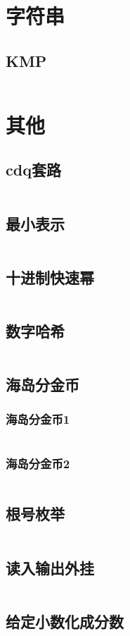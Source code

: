 \documentclass{article}
\begin{document}
\newpage
\section{字符串}
\subsection{KMP}
\inputminted[breaklines]{c++}{../字符串/KMP.cpp}

\newpage
\section{其他}

\subsection{cdq套路}
\inputminted[breaklines]{text}{../其他/cdq.cpp}

\subsection{最小表示}
\inputminted[breaklines]{c++}{../其他/最小表示.cpp}

\subsection{十进制快速幂}
\inputminted[breaklines]{c++}{../其他/十进制快速幂.cpp}

\subsection{数字哈希}
\inputminted[breaklines]{c++}{../其他/数字哈希.cpp}

\subsection{海岛分金币}
\subsubsection{海岛分金币1}
\inputminted[breaklines]{c++}{../其他/海岛分金币1.cpp}

\subsubsection{海岛分金币2}
\inputminted[breaklines]{c++}{../其他/海岛分金币2.cpp}

\subsection{根号枚举}
\inputminted[breaklines]{c++}{../其他/根号枚举.cpp}

\subsection{读入输出外挂}
\inputminted[breaklines]{c++}{../其他/读入输出外挂.cpp}

\subsection{给定小数化成分数}
\inputminted[breaklines]{python}{../其他/给定小数化成分数.py}

\end{document}
